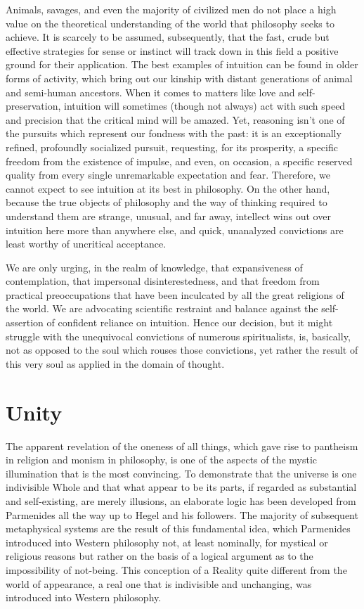 \documentclass[a4paper,12pt]{book}[2004/02/16]
\theoremstyle{ilemma}
\theoremstyle{itheorem}
\theoremstyle{iother}
\theoremstyle{icorollary}
\theoremstyle{numcorollary}
\theoremstyle{idefinition}
\begin{document}
Animals, savages, and even the majority of civilized men do not place a high value on the theoretical understanding of the world that philosophy seeks to achieve. It is scarcely to be
assumed, subsequently, that the fast, crude but effective strategies for
sense or instinct will track down in this field a positive ground for
their application. The best examples of intuition can be found in older forms of activity, which bring out our kinship with distant generations of animal and semi-human ancestors. When it comes to matters like love and self-preservation, intuition will sometimes (though not always) act with such speed and precision that the critical mind will be amazed. Yet, reasoning isn't one of the pursuits which
represent our fondness with the past: it is an exceptionally refined, profoundly
socialized pursuit, requesting, for its prosperity, a specific freedom
from the existence of impulse, and even, on occasion, a specific reserved quality
from every single unremarkable expectation and fear. Therefore, we cannot expect to see intuition at its best in philosophy. On the other hand, because the true objects of philosophy and the way of thinking required to understand them are strange, unusual, and far away, intellect wins out over intuition here more than anywhere else, and quick, unanalyzed convictions are least worthy of uncritical acceptance.

We are only urging, in the realm of knowledge, that expansiveness of contemplation, that impersonal disinterestedness, and that freedom from practical preoccupations that have been inculcated by all the great religions of the world. We are advocating scientific restraint and balance against the self-assertion of confident reliance on intuition. Hence our decision, but it might struggle with the
unequivocal convictions of numerous spiritualists, is, basically, not as opposed to the soul which rouses those convictions, yet rather the result of this
very soul as applied in the domain of thought.

\section{Unity}
The apparent revelation of the oneness of all things, which gave rise to pantheism in religion and monism in philosophy, is one of the aspects of the mystic illumination that is the most convincing. To demonstrate that the universe is one indivisible Whole and that what appear to be its parts, if regarded as substantial and self-existing, are merely illusions, an elaborate logic has been developed from Parmenides all the way up to Hegel and his followers. The majority of subsequent metaphysical systems are the result of this fundamental idea, which Parmenides introduced into Western philosophy not, at least nominally, for mystical or religious reasons but rather on the basis of a logical argument as to the impossibility of not-being. This conception of a Reality quite different from the world of appearance, a real one that is indivisible and unchanging, was introduced into Western philosophy.
\end{document}
